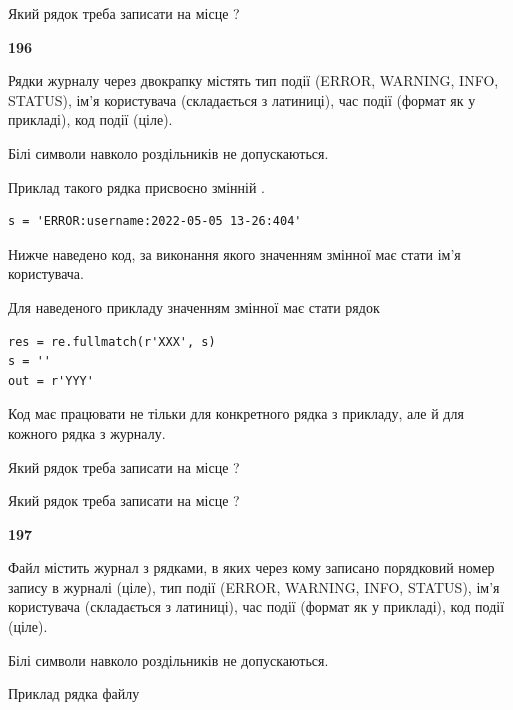 Який рядок треба записати на місце  ?\par


\newpage

{\begin {center}\textbf{ 196}\end {center}}\par
Рядки журналу через двокрапку містять тип події (ERROR, WARNING, INFO, STATUS), ім'я користувача (складається з латиниці), час події (фор\-мат як у прикладі), код події (ціле).

Білі символи навколо роздільників не допускаються.

Приклад такого рядка присвоєно змінній .



\begin{verbatim}
s = 'ERROR:username:2022-05-05 13-26:404'
\end{verbatim}


Нижче наведено код, за виконання якого значенням змінної  має стати ім'я користувача.

Для наведеного прикладу значенням змінної  має стати рядок 



\begin{verbatim}
res = re.fullmatch(r'XXX', s)
s = ''
out = r'YYY'
\end{verbatim}


Код має працювати не тільки для конкретного рядка з прикладу, але й для кожного рядка з журналу.




Який рядок треба записати на місце  ?\par
\vspace{5mm}


Який рядок треба записати на місце  ?\par


\newpage

{\begin {center}\textbf{ 197}\end {center}}\par
Файл  містить журнал з рядками, в яких через кому записано поряд\-ко\-вий номер запису в журналі (ціле), тип події (ERROR, WARNING, INFO, STATUS), ім'я користувача (складається з латиниці), час події (фор\-мат як у прикладі), код події (ціле).

Білі символи навколо роздільників не допускаються.

Приклад рядка файлу



